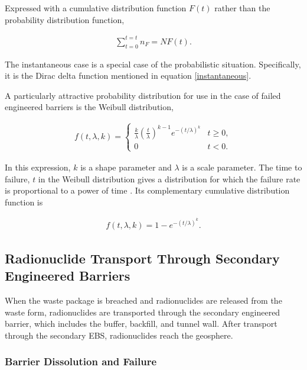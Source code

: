 Expressed with a cumulative distribution function $F(t)$ rather than the
probability distribution function, 


\begin{align}
  \sum_{t=0}^{t=t}n_F=NF(t).
  \label{cdf}
\end{align}

The instantaneous case is a special case of the probabilistic situation. 
Specifically, it is the Dirac delta function mentioned in equation 
\eqref{instantaneous}.

A particularly attractive probability distribution for use in the case of failed 
engineered barriers is the Weibull distribution, 

\begin{align}
  f(t,\lambda,k) =  \begin{cases}
    \frac{k}{\lambda}\left(\frac{t}{\lambda}\right)^{k-1}e^{-(t/\lambda)^{k}} & 
    t\geq0 ,\\
    0 & t<0 .\end{cases}
  \label{weibullpdf}
\end{align}


In this expression, $k$ is a shape parameter and $\lambda$ is a scale
parameter. The time to failure, $t$ in the Weibull distribution gives a 
distribution for which the failure rate is proportional to a power of time 
\cite{papoulis_probability_2002}. Its complementary cumulative distribution
function is 

\begin{align}
  f(t,\lambda,k) = 1-e^{-(t/\lambda)^k}.
  \label{weibullcdf}
\end{align}



\subsection{Radionuclide Transport Through Secondary Engineered Barriers}

When the waste package is breached and radionuclides are released from the waste 
form, radionuclides are transported through the secondary engineered barrier, 
which includes the buffer, backfill, and tunnel wall. After transport through 
the secondary \gls{EBS}, radionuclides reach the geosphere. 

\subsubsection{Barrier Dissolution and Failure}

